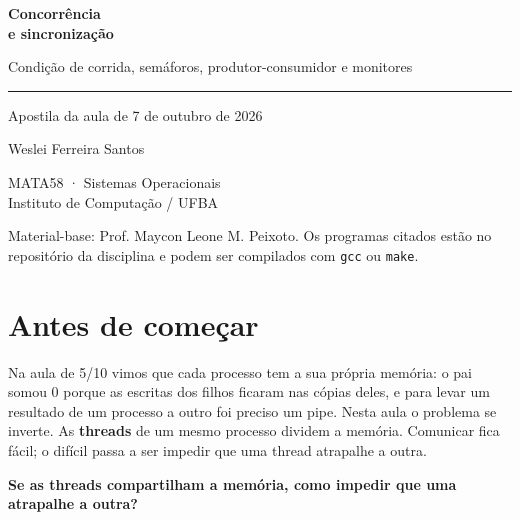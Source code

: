 \documentclass[11pt,a4paper]{article}
\newcommand{\cmd}[1]{\texttt{#1}}
\begin{document}
\begin{titlepage}
\thispagestyle{empty}
\vspace*{5cm}
{\color{mDarkTeal}\fontsize{28}{34}\selectfont\bfseries Concorrência\\[0.2em] e sincronização\par}
\vspace{0.8em}
{\Large\color{mDarkTeal!80} Condição de corrida, semáforos, produtor-consumidor e monitores\par}
\vspace{1em}
{\color{mLightBrown}\rule{\linewidth}{1.2pt}}
\vspace{1em}

{\large Apostila da aula de 7 de outubro de 2026\par}
\vspace{3em}
{\large Weslei Ferreira Santos\par}
\vspace{0.6em}
MATA58 · Sistemas Operacionais\\
Instituto de Computação / UFBA

\vfill
{\small\color{black!60} Material-base: Prof. Maycon Leone M. Peixoto. Os programas citados estão no repositório da disciplina e podem ser compilados com \cmd{gcc} ou \cmd{make}.\par}
\end{titlepage}

\tableofcontents
\clearpage

\section{Antes de começar}

Na aula de 5/10 vimos que cada processo tem a sua própria memória: o pai somou 0 porque as escritas dos filhos ficaram nas cópias deles, e para levar um resultado de um processo a outro foi preciso um pipe. Nesta aula o problema se inverte. As \textbf{threads} de um mesmo processo dividem a memória. Comunicar fica fácil; o difícil passa a ser impedir que uma thread atrapalhe a outra.

\begin{center}
{\large\bfseries\color{mDarkTeal} Se as threads compartilham a memória, como impedir que uma atrapalhe a outra?}
\end{center}
\end{document}

